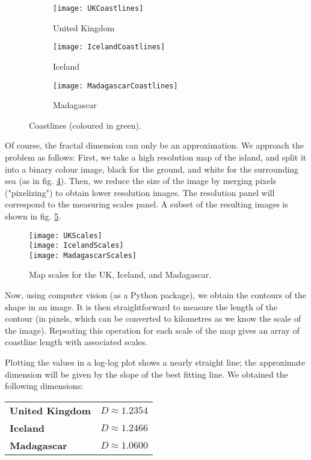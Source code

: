 \begin{figure}[!h]
	\centering
	\begin{subfigure}{.33\textwidth}
		\texttt{[image: UKCoastlines]}
		\centering
		\captionsetup{justification=centering}
		\caption{United Kingdom}
		\label{fig:UKCoastlines}
	\end{subfigure}
	\begin{subfigure}{.33\textwidth}
		\texttt{[image: IcelandCoastlines]}
		\centering
		\captionsetup{justification=centering}
		\caption{Iceland}
		\label{fig:IcelandCoastlines}
	\end{subfigure}
	\begin{subfigure}{.30\textwidth}
		\texttt{[image: MadagascarCoastlines]}
		\centering
		\captionsetup{justification=centering}
		\caption{Madagascar}
		\label{fig:MadagascarCoastlines}
	\end{subfigure}
	\caption{Coastlines (coloured in green).}
	\label{fig:islandsCoastlines}
\end{figure}

Of course, the fractal dimension can only be an approximation.
We approach the problem as follows:
First, we take a high resolution map of the island, and split it into a binary colour image, black for the ground, and white for the surrounding sea (as in fig. \ref{fig:islandsCoastlines}).
Then, we reduce the size of the image by merging pixels ("pixelizing") to obtain lower resolution images.
The resolution panel will correspond to the measuring scales panel.
A subset of the resulting images is shown in fig. \ref{fig:islandsScales}.

\begin{figure}[!h]
	\texttt{[image: UKScales]}\\
	\texttt{[image: IcelandScales]}\\
	\texttt{[image: MadagascarScales]}
	\centering
	\caption{Map scales for the UK, Iceland, and Madagascar.}
	\label{fig:islandsScales}
\end{figure}

Now, using computer vision (as a Python package), we obtain the contours of the shape in an image.
It is then straightforward to measure the length of the contour (in pixels, which can be converted to kilometres as we know the scale of the image).
Repeating this operation for each scale of the map gives an array of coastline length with associated scales.

Plotting the values in a log-log plot shows a nearly straight line; the approximate dimension will be given by the slope of the best fitting line.
We obtained the following dimensions:\\
\begin{tabular}{l l}\label{table:islandsDimensionRegression}
	\textbf{United Kingdom} & $D \approx 1.2354$ \\
	\textbf{Iceland}        & $D \approx 1.2466$ \\
	\textbf{Madagascar}     & $D \approx 1.0600$
\end{tabular}

